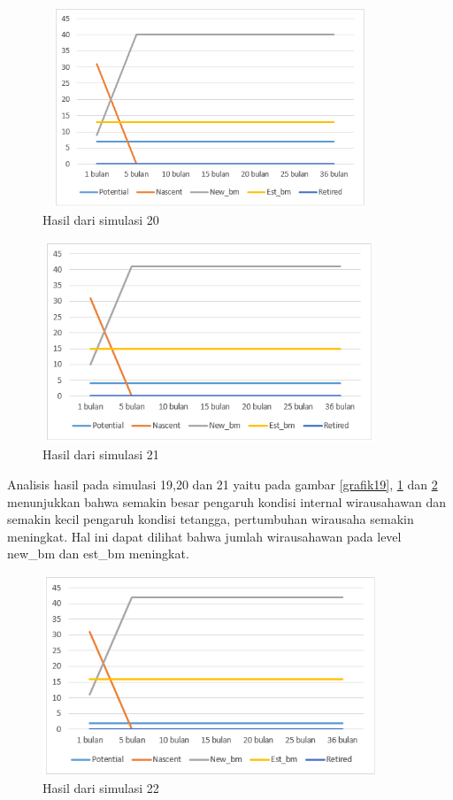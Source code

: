 	\begin{figure} [H]
	\centering  
	\includegraphics[width=10cm, height=6cm]{grafik20} 
		\caption[Hasil dari simulasi 20]{Hasil dari simulasi 20}
	\label{grafik20} 
\end{figure}

	\begin{figure} [H]
	\centering  
	\includegraphics[width=10cm, height=6cm]{grafik21} 
		\caption[Hasil dari simulasi 21]{Hasil dari simulasi 21}
	\label{grafik21} 
\end{figure}

Analisis hasil pada simulasi 19,20 dan 21 yaitu pada gambar \ref{grafik19}, \ref{grafik20} dan \ref{grafik21} menunjukkan bahwa semakin besar pengaruh kondisi internal wirausahawan dan semakin kecil pengaruh kondisi tetangga, pertumbuhan wirausaha semakin meningkat. Hal ini dapat dilihat bahwa jumlah wirausahawan pada level new\_bm dan est\_bm meningkat.

	\begin{figure} [H]
	\centering  
	\includegraphics[width=10cm, height=6cm]{grafik22} 
		\caption[Hasil dari simulasi 22]{Hasil dari simulasi 22}
	\label{grafik22} 
\end{figure}

